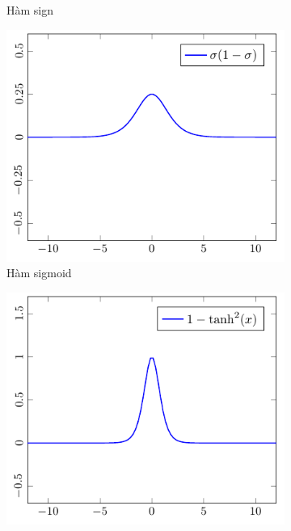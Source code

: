 \begin{figure}[htbp]
\begin{subfigure}[b]{0.33\textwidth}
        \caption{Hàm sign}
    \end{subfigure}\hfil%
    \begin{subfigure}[b]{0.33\textwidth}
        \centering
        \includegraphics[width=\textwidth]{tikz_image/diff_sigmoid.pdf}
        \caption{Hàm sigmoid}
    \end{subfigure}\newline
    \begin{subfigure}[b]{0.33\textwidth}
        \centering
        \includegraphics[width=\textwidth]{tikz_image/diff_tanh.pdf}

\end{subfigure}
\end{figure}
